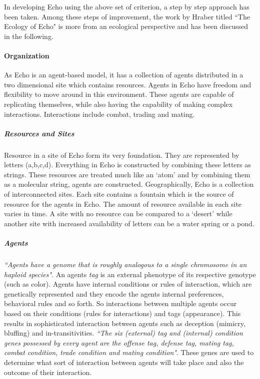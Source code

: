 \documentclass[letterpaper]{article}
\numberwithin{equation}{section}
\begin{document}
In developing Echo using the above set of criterion, a step by step approach has been taken. Among these steps of improvement, the work by Hraber titled ``The Ecology of Echo" \cite{hraber1997} is more from an ecological perspective and has been discussed in the following.

\paragraph{Organization}
As Echo is an agent-based model, it has a collection of agents distributed in a two dimensional site which contains resources. Agents in Echo have freedom and flexibility to move around in this environment. These agents are capable of replicating themselves, while also having the capability of making complex interactions. Interactions include combat, trading and mating.

\subparagraph{Resources and Sites}
Resource in a site of Echo form its very foundation. They are represented by letters (a,b,c,d). Everything in Echo is constructed by combining these letters as strings. These resources are treated much like an `atom' and by combining them as a molecular string, agents are constructed. Geographically, Echo is a collection of interconnected sites. Each site contains a fountain which is the source of resource for the agents in Echo. The amount of resource available in each site varies in time. A site with no resource can be compared to a `desert' while another site with increased availability of letters can be a water spring or a pond. 

\subparagraph{Agents}
\textsl{``Agents have a genome that is roughly analogous to a single chromosome in an haploid species"}. An agents \textsl{tag} is an external phenotype of its respective genotype (such as color). Agents have internal conditions or rules of interaction, which are genetically represented and they encode the agents internal preferences, behavioral rules and so forth. So interactions between multiple agents occur based on their conditions (rules for interactions) and tags (appearance). This results in sophisticated interaction between agents such as deception (mimicry, bluffing) and in-transitivities. \textsl{``The six (external) tag and (internal) condition genes possessed by every agent are the offense tag, defense tag, mating tag, combat condition, trade condition and mating condition"}. These genes are used to determine what sort of interaction between agents will take place and also the outcome of their interaction. 
\end{document}
